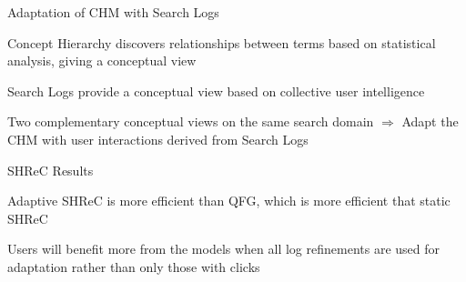 \begin{frame}{Adaptation of CHM with Search Logs}

Concept Hierarchy discovers relationships between terms based on statistical analysis, giving a conceptual view \newline

Search Logs provide a conceptual view based on collective user intelligence \newline

Two complementary conceptual views on the same search domain
$ \Rightarrow $
Adapt the CHM with user interactions derived from Search Logs

\end{frame}


\begin{frame}{SHReC Results}

Adaptive SHReC is more efficient than QFG, which is more efficient that static SHReC \newline

Users will benefit more from the models when all log refinements are used for adaptation rather than only those with clicks

\end{frame}

